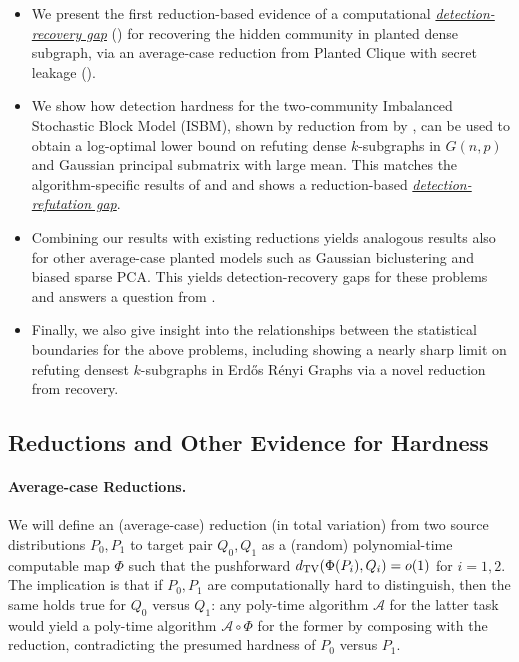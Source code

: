 \documentclass[final,12pt]{colt2023} %
\newcommand\1[1]{\mathbb{I}_{\left\{#1\right\}}}
\begin{document}
\begin{itemize}
    \item %
    We present the first reduction-based evidence of a computational \underline{\emph{detection-recovery gap}} () for recovering the hidden community in planted dense subgraph, via an average-case reduction from Planted Clique with secret leakage (). 
    \item We show how detection hardness for the two-community Imbalanced Stochastic Block Model (ISBM), shown by reduction from  by \cite{BB20}, can be used to obtain a log-optimal lower bound on refuting dense $k$-subgraphs in $G(n, p)$ and Gaussian principal submatrix with large mean. This matches the algorithm-specific results of \cite{BHK16} and \cite{SoSrefute} and shows a reduction-based \underline{\emph{detection-refutation gap}}.
    \item Combining our results with existing reductions yields analogous results also for other average-case planted models such as Gaussian biclustering and biased sparse PCA. This yields detection-recovery gaps for these problems and answers a question from \cite{BBH18}. 
    \item Finally, we also give insight into the relationships between the statistical boundaries for the above problems, including showing a nearly sharp limit on refuting densest $k$-subgraphs in Erd\H{o}s R\'enyi Graphs via a novel reduction from recovery.
\end{itemize}




\subsection{Reductions and Other Evidence for Hardness}

\paragraph{Average-case Reductions.} We will define an (average-case) reduction (in total variation) from two source distributions $P_0, P_1$ to target pair $Q_0,Q_1$ as a (random) polynomial-time computable map $\Phi$ such that the pushforward $d_{\rm TV}(\Phi(P_i), Q_i)=o(1)$ for $i=1,2$. The implication is that if $P_0, P_1$ are computationally hard to distinguish, then the same holds true for $Q_0$ versus $Q_1$: any poly-time algorithm $\mathcal{A}$ for the latter task would yield a poly-time algorithm $\mathcal{A} \circ \Phi$ for the former by composing with the reduction, contradicting the presumed hardness of $P_0$ versus $ P_1$. 
\end{document}
